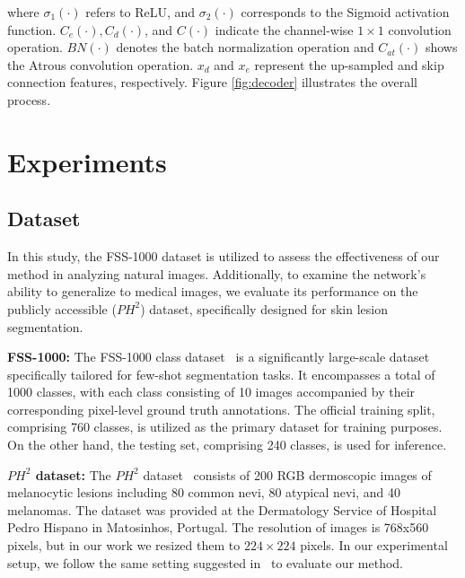 \documentclass[runningheads]{llncs}
\begin{document}
\noindent where  $\sigma_1(\cdot)$ refers to ReLU, and $\sigma_2(\cdot)$ corresponds to the Sigmoid activation function. $C_e(\cdot), C_d(\cdot)$, and $C(\cdot)$ indicate the channel-wise $1 \times 1$ convolution operation. $B N(\cdot)$ denotes the batch normalization operation and $C_{at}(\cdot)$ shows the Atrous convolution operation. $x_d$ and $x_e$ represent the up-sampled and skip connection features, respectively. Figure \ref{fig:decoder} illustrates the overall process.



\section{Experiments}
\subsection{Dataset}
In this study, the FSS-1000 dataset is utilized to assess the effectiveness of our method in analyzing natural images. Additionally, to examine the network's ability to generalize to medical images, we evaluate its performance on the publicly accessible ($PH^2$) dataset, specifically designed for skin lesion segmentation. 

\noindent \textbf{FSS-1000:} The FSS-1000 class dataset~\cite{li2020fss} is a significantly large-scale dataset specifically tailored for few-shot segmentation tasks. It encompasses a total of 1000 classes, with each class consisting of 10 images accompanied by their corresponding pixel-level ground truth annotations. The official training split, comprising 760 classes, is utilized as the primary dataset for training purposes. On the other hand, the testing set, comprising 240 classes, is used for inference.


\noindent\textbf{$PH^2$ dataset:} The $PH^2$ dataset~\cite{mendoncca2013ph} consists of 200 RGB dermoscopic images of melanocytic lesions including 80 common nevi, 80 atypical nevi, and 40 melanomas. The dataset was provided at the Dermatology Service of Hospital Pedro Hispano in Matosinhos, Portugal. The resolution of images is 768x560 pixels, but in our work we resized them to $224{\times}224$ pixels. 
In our experimental setup, we follow the same setting suggested in~\cite{feyjie2020semi} to evaluate our method.
\end{document}
